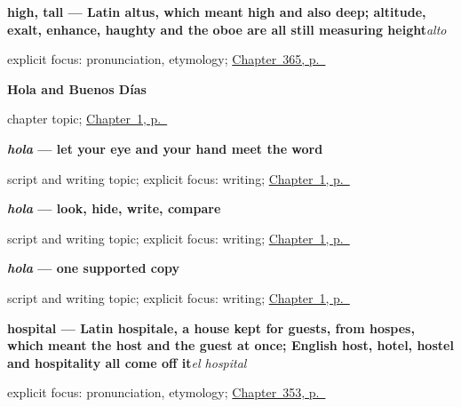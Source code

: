 \noindent\begin{minipage}[t]{\linewidth}
\raggedright
\textbf{high, tall — Latin altus, which meant high and also deep; altitude, exalt, enhance, haughty and the oboe are all still measuring height}\enspace\emph{alto}\par
\footnotesize explicit focus: pronunciation, etymology; \hyperref[ch:alto-y-largo]{Chapter~365, p.~\pageref*{ch:alto-y-largo}}
\end{minipage}\par\smallskip

\noindent\begin{minipage}[t]{\linewidth}
\raggedright
\textbf{Hola and Buenos Días}\par
\footnotesize chapter topic; \hyperref[ch:first-words]{Chapter~1, p.~\pageref*{ch:first-words}}
\end{minipage}\par\smallskip

\noindent\begin{minipage}[t]{\linewidth}
\raggedright
\textbf{\emph{hola} — let your eye and your hand meet the word}\par
\footnotesize script and writing topic; explicit focus: writing; \hyperref[ch:first-words]{Chapter~1, p.~\pageref*{ch:first-words}}
\end{minipage}\par\smallskip

\noindent\begin{minipage}[t]{\linewidth}
\raggedright
\textbf{\emph{hola} — look, hide, write, compare}\par
\footnotesize script and writing topic; explicit focus: writing; \hyperref[ch:first-words]{Chapter~1, p.~\pageref*{ch:first-words}}
\end{minipage}\par\smallskip

\noindent\begin{minipage}[t]{\linewidth}
\raggedright
\textbf{\emph{hola} — one supported copy}\par
\footnotesize script and writing topic; explicit focus: writing; \hyperref[ch:first-words]{Chapter~1, p.~\pageref*{ch:first-words}}
\end{minipage}\par\smallskip

\noindent\begin{minipage}[t]{\linewidth}
\raggedright
\textbf{hospital — Latin hospitale, a house kept for guests, from hospes, which meant the host and the guest at once; English host, hotel, hostel and hospitality all come off it}\enspace\emph{el hospital}\par
\footnotesize explicit focus: pronunciation, etymology; \hyperref[ch:el-hospital-y-el-banco]{Chapter~353, p.~\pageref*{ch:el-hospital-y-el-banco}}
\end{minipage}\par\smallskip

